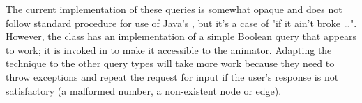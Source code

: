 The current implementation of these queries is somewhat opaque and does not
follow standard procedure for use of Java's , but it's a
case of "if it ain't broke \ldots".
However, the class  has an implementation of a simple
Boolean query that appears to work; it is invoked in  to make
it accessible to the animator.
Adapting the technique to the other query types will take more work because
they need to throw exceptions and repeat the request for input if the user's
response is not satisfactory (a malformed number, a non-existent node or edge).

